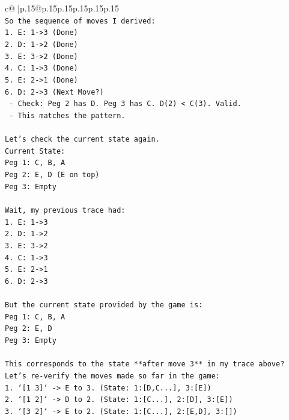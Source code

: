 \documentclass{article}
\begin{document}
{\begin{supertabular}{c@{$\;$}|p{.15\linewidth}@{}p{.15\linewidth}p{.15\linewidth}p{.15\linewidth}p{.15\linewidth}p{.15\linewidth}}
{{{\\ 
\texttt{So the sequence of moves I derived:} \\
\texttt{1. E: 1{-}>3 (Done)} \\
\texttt{2. D: 1{-}>2 (Done)} \\
\texttt{3. E: 3{-}>2 (Done)} \\
\texttt{4. C: 1{-}>3 (Done)} \\
\texttt{5. E: 2{-}>1 (Done)} \\
\texttt{6. D: 2{-}>3 (Next Move?)} \\
\texttt{   {-} Check: Peg 2 has D. Peg 3 has C. D(2) < C(3). Valid.} \\
\texttt{   {-} This matches the pattern.} \\
\\ 
\texttt{Let's check the current state again.} \\
\texttt{Current State:} \\
\texttt{Peg 1: C, B, A} \\
\texttt{Peg 2: E, D (E on top)} \\
\texttt{Peg 3: Empty} \\
\\ 
\texttt{Wait, my previous trace had:} \\
\texttt{1. E: 1{-}>3} \\
\texttt{2. D: 1{-}>2} \\
\texttt{3. E: 3{-}>2} \\
\texttt{4. C: 1{-}>3} \\
\texttt{5. E: 2{-}>1} \\
\texttt{6. D: 2{-}>3} \\
\\ 
\texttt{But the current state provided by the game is:} \\
\texttt{Peg 1: C, B, A} \\
\texttt{Peg 2: E, D} \\
\texttt{Peg 3: Empty} \\
\\ 
\texttt{This corresponds to the state **after move 3** in my trace above?} \\
\texttt{Let's re{-}verify the moves made so far in the game:} \\
\texttt{1. `{[}1 3{]}` {-}> E to 3. (State: 1:{[}D,C...{]}, 3:{[}E{]})} \\
\texttt{2. `{[}1 2{]}` {-}> D to 2. (State: 1:{[}C...{]}, 2:{[}D{]}, 3:{[}E{]})} \\
\texttt{3. `{[}3 2{]}` {-}> E to 2. (State: 1:{[}C...{]}, 2:{[}E,D{]}, 3:{[}{]})} \\
}}}
\end{supertabular}}
\end{document}
